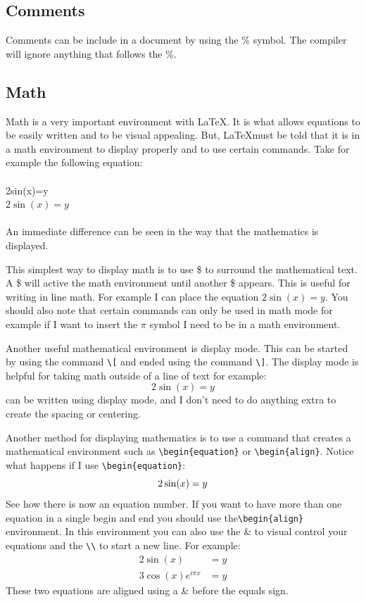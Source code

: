 \documentclass{article} 	%
\numberwithin{equation}{section}
\begin{document}
		\subsection{Comments}
		Comments can be include in a document by using the \% symbol.  The compiler will ignore anything that follows the \%.

		\subsection{Math}
		Math is a very important environment with \LaTeX.  It is what allows equations to be easily written and to be visual appealing.  But, \LaTeX must be told that it is in a math environment to display properly and to use certain commands.  Take for example the following equation:\\
		\\
		2sin(x)=y \\
		$2\sin(x)=y$\\
		\\
		An immediate difference can be seen in the way that the mathematics is displayed.

		This simplest way to display math is to use \$ to surround the mathematical text.  A \$ will active the math environment until another \$ appears.  This is useful for writing in line math.  For example I can place the equation $2\sin(x)=y$.  You should also note that certain commands can only be used in math mode for example if I want to insert the $\pi$ symbol I need to be in a math environment.

		Another useful mathematical environment is display mode.  This can be started by using the command \verb|\[| and ended using the command \verb|\]|.  The display mode is helpful for taking math outside of a line of text for example: \[2\sin(x)=y\] can be written using display mode, and I don't need to do anything extra to create the spacing or centering.

		Another method for displaying mathematics is to use a command that creates a mathematical environment such as \verb|\begin{equation}| or \verb|\begin{align}|.  Notice what happens if I use \verb|\begin{equation}|:
		\begin{equation}
			2\sin(x)=y \\
		\end{equation}
		See how there is now an equation number.  If you want to have more than one equation in a single begin and end you should use the\verb|\begin{align}| environment.  In this environment you can also use the \& to visual control your equations and the \verb|\\| to start a new line.  For example:
		\begin{align}
			2\sin(x)&=y \\
			3\cos(x)e^{i\pi x}&=y
		\end{align}
		These two equations are aligned using a \& before the equals sign.
\end{document}
